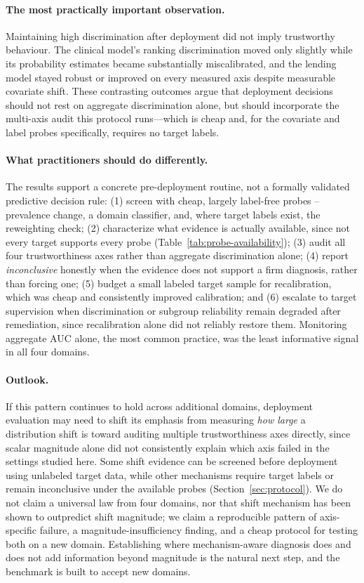\documentclass[11pt]{article}
\begin{document}
\paragraph{The most practically important observation.} Maintaining high discrimination after
deployment did not imply trustworthy behaviour. The clinical model's ranking discrimination moved
only slightly while its probability estimates became substantially miscalibrated, and the lending
model stayed robust or improved on every measured axis despite measurable covariate shift. These
contrasting outcomes argue that deployment decisions should not rest on aggregate discrimination
alone, but should incorporate the multi-axis audit this protocol runs---which is cheap and, for the
covariate and label probes specifically, requires no target labels.

\paragraph{What practitioners should do differently.} The results support a concrete pre-deployment
routine, not a formally validated predictive decision rule: (1) screen with cheap, largely
label-free probes -- prevalence change, a domain classifier, and, where target labels exist, the
reweighting check; (2) characterize what evidence is actually available, since not every target
supports every probe (Table~\ref{tab:probe-availability}); (3) audit all four trustworthiness axes
rather than aggregate discrimination alone; (4) report \emph{inconclusive} honestly when the
evidence does not support a firm diagnosis, rather than forcing one; (5) budget a small labeled
target sample for recalibration, which was cheap and consistently improved calibration; and
(6) escalate to target supervision when discrimination or subgroup reliability remain degraded
after remediation, since recalibration alone did not reliably restore them. Monitoring aggregate
AUC alone, the most common practice, was the least informative signal in all four domains.

\paragraph{Outlook.} If this pattern continues to hold across additional domains, deployment
evaluation may need to shift its emphasis from measuring \emph{how large} a distribution shift is
toward auditing multiple trustworthiness axes directly, since scalar magnitude alone did not
consistently explain which axis failed in the settings studied here. Some shift evidence can be
screened before deployment using unlabeled target data, while other mechanisms require target
labels or remain inconclusive under the available probes (Section~\ref{sec:protocol}). We do not
claim a universal law from four domains, nor that shift mechanism has been shown to outpredict
shift magnitude; we claim a reproducible pattern of axis-specific failure, a magnitude-insufficiency
finding, and a cheap protocol for testing both on a new domain. Establishing where mechanism-aware
diagnosis does and does not add information beyond magnitude is the natural next step, and the
benchmark is built to accept new domains.
\end{document}
